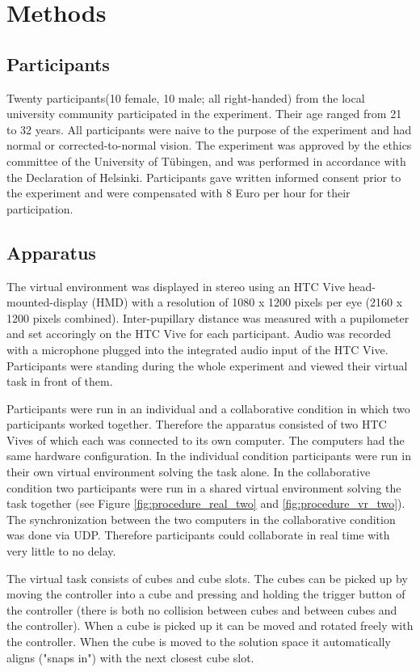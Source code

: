 \section{Methods}

\subsection{Participants}
Twenty participants(10 female, 10 male; all right-handed) from the local university community participated in the experiment. Their age ranged from 21 to 32 years. All participants were naive to the purpose of the experiment and had normal or corrected-to-normal vision. The experiment was approved by the ethics committee of the University of T\"ubingen, and was performed in accordance with the Declaration of Helsinki. Participants gave written informed consent prior to the experiment and were compensated with 8 Euro per hour for their participation. 

\subsection{Apparatus}
The virtual environment was displayed in stereo using an HTC Vive head-mounted-display (HMD) with a resolution of 1080 x 1200 pixels per eye (2160 x 1200 pixels combined). Inter-pupillary distance was measured with a pupilometer and set accoringly on the HTC Vive for each participant. Audio was recorded with a microphone plugged into the integrated audio input of the HTC Vive. Participants were standing during the whole experiment and viewed their virtual task in front of them.

Participants were run in an individual and a collaborative condition in which two participants worked together. Therefore the apparatus consisted of two HTC Vives of which each was connected to its own computer. The computers had the same hardware configuration. In the individual condition participants were run in their own virtual environment solving the task alone. In the collaborative condition two participants were run in a shared virtual environment solving the task together (see Figure \ref{fig:procedure_real_two} and \ref{fig:procedure_vr_two}). The synchronization between the two computers in the collaborative condition was done via UDP. Therefore participants could collaborate in real time with very little to no delay.

The virtual task consists of cubes and cube slots. The cubes can be picked up by moving the controller into a cube and pressing and holding the trigger button of the controller (there is both no collision between cubes and between cubes and the controller). When a cube is picked up it can be moved and rotated freely with the controller. When the cube is moved to the solution space it  automatically aligns ("snaps in") with the next closest cube slot.

